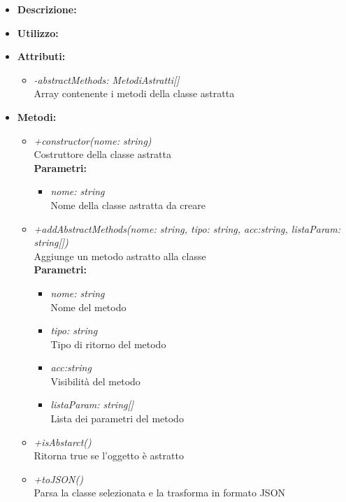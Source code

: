 \begin{itemize}
	\item \textbf{Descrizione:}\\
	
	\item \textbf{Utilizzo:}\\
	
	\item \textbf{Attributi:}
		\begin{itemize}
			\item \emph{-abstractMethods: MetodiAstratti[]}\\
			Array contenente i metodi della classe astratta
		\end{itemize}
	\item \textbf{Metodi:}
		\begin{itemize}
			\item \emph{+constructor(nome: string)}\\
    		Costruttore della classe astratta\\
    		\textbf{Parametri:}
    		\begin{itemize}
    			\item \emph{nome: string}\\
    			Nome della classe astratta da creare
    		\end{itemize}
    		\item \emph{+addAbstractMethods(nome: string, tipo: string, acc:string, listaParam: string[])}\\
    		Aggiunge un metodo astratto alla classe\\
    		\textbf{Parametri:}
    		\begin{itemize}
    			\item \emph{nome: string}\\
    			Nome del metodo
    			\item \emph{tipo: string}\\
    			Tipo di ritorno del metodo
    			\item \emph{acc:string}\\
    			Visibilità del metodo
    			\item \emph{listaParam: string[]}\\
    			Lista dei parametri del metodo
    		\end{itemize}
    		\item \emph{+isAbstarct()}\\
    		Ritorna true se l'oggetto è astratto
    		\item \emph{+toJSON()}\\
    		Parsa la classe selezionata e la trasforma in formato JSON
    	\end{itemize}
\end{itemize}